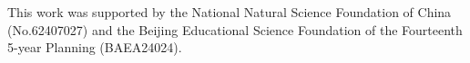 \documentclass[runningheads]{llncs}
\begin{document}
\begin{credits}
\subsubsection{\ackname}  This work was supported by the National Natural Science Foundation of China (No.62407027) and the Beijing Educational Science Foundation of the Fourteenth 5-year Planning (BAEA24024).
\end{credits}

%
%
%


%






\end{document}
